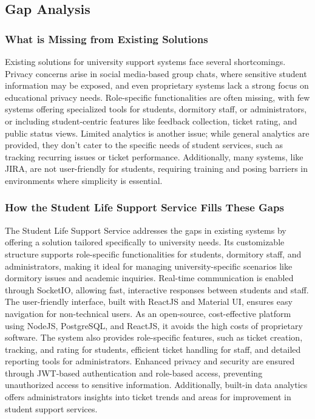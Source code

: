 		
\subsection{Gap Analysis}

	\subsubsection{What is Missing from Existing Solutions}
	Existing solutions for university support systems face several shortcomings. Privacy concerns arise in social media-based group chats, where sensitive student information may be exposed, and even proprietary systems lack a strong focus on educational privacy needs. Role-specific functionalities are often missing, with few systems offering specialized tools for students, dormitory staff, or administrators, or including student-centric features like feedback collection, ticket rating, and public status views. Limited analytics is another issue; while general analytics are provided, they don’t cater to the specific needs of student services, such as tracking recurring issues or ticket performance. Additionally, many systems, like JIRA, are not user-friendly for students, requiring training and posing barriers in environments where simplicity is essential.
	
	\subsubsection{How the Student Life Support Service Fills These Gaps}
	The Student Life Support Service addresses the gaps in existing systems by offering a solution tailored specifically to university needs. Its customizable structure supports role-specific functionalities for students, dormitory staff, and administrators, making it ideal for managing university-specific scenarios like dormitory issues and academic inquiries. Real-time communication is enabled through SocketIO, allowing fast, interactive responses between students and staff. The user-friendly interface, built with ReactJS and Material UI, ensures easy navigation for non-technical users. As an open-source, cost-effective platform using NodeJS, PostgreSQL, and ReactJS, it avoids the high costs of proprietary software. The system also provides role-specific features, such as ticket creation, tracking, and rating for students, efficient ticket handling for staff, and detailed reporting tools for administrators. Enhanced privacy and security are ensured through JWT-based authentication and role-based access, preventing unauthorized access to sensitive information. Additionally, built-in data analytics offers administrators insights into ticket trends and areas for improvement in student support services.
	
	
	
			